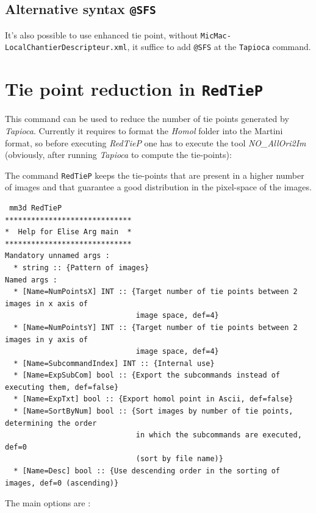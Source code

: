 \subsection{Alternative syntax {\tt @SFS}}

It's also possible to use enhanced tie point, without {\tt MicMac-LocalChantierDescripteur.xml},
it suffice to add {\tt @SFS} at the {\tt Tapioca} command.

\section{Tie point reduction in {\tt RedTieP}}


This command can be used to reduce the number of tie points generated by \textit{Tapioca}. Currently it requires to format the \textit{Homol} folder into the Martini format, so before executing \textit{RedTieP} one has to execute the tool \textit{NO\_AllOri2Im} (obviously, after running \textit{Tapioca} to compute the tie-points):

The command {\tt RedTieP} keeps the tie-points that are present in a higher number of images and that guarantee a good distribution in the pixel-space of the images. 

\begin{verbatim}
 mm3d RedTieP
*****************************
*  Help for Elise Arg main  *
*****************************
Mandatory unnamed args : 
  * string :: {Pattern of images}
Named args : 
  * [Name=NumPointsX] INT :: {Target number of tie points between 2 images in x axis of 
                              image space, def=4}
  * [Name=NumPointsY] INT :: {Target number of tie points between 2 images in y axis of 
                              image space, def=4}
  * [Name=SubcommandIndex] INT :: {Internal use}
  * [Name=ExpSubCom] bool :: {Export the subcommands instead of executing them, def=false}
  * [Name=ExpTxt] bool :: {Export homol point in Ascii, def=false}
  * [Name=SortByNum] bool :: {Sort images by number of tie points, determining the order 
                              in which the subcommands are executed, def=0 
                              (sort by file name)}
  * [Name=Desc] bool :: {Use descending order in the sorting of images, def=0 (ascending)}
\end{verbatim}

The main options are :


